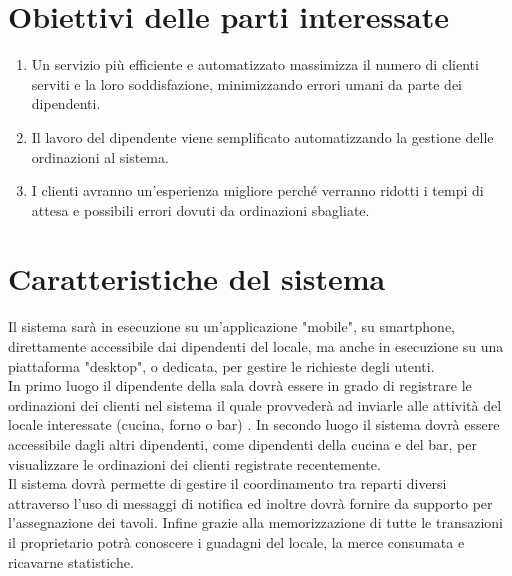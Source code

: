 \section{Obiettivi delle parti interessate}
\begin{enumerate}
    \item Un servizio più efficiente e automatizzato massimizza il numero di clienti serviti e la loro soddisfazione, minimizzando errori umani da parte dei dipendenti.
    \item Il lavoro del dipendente viene semplificato automatizzando la gestione delle ordinazioni al sistema.
    \item I clienti avranno un’esperienza migliore perché verranno ridotti i tempi di attesa e possibili errori dovuti da ordinazioni sbagliate. 
\end{enumerate}

\section{Caratteristiche del sistema}

Il sistema sarà in esecuzione su un’applicazione "mobile", su smartphone, direttamente accessibile dai dipendenti del locale, ma anche in esecuzione su una piattaforma "desktop", o dedicata, per gestire le richieste degli utenti. \\
In primo luogo il dipendente della sala dovrà essere in grado di registrare le ordinazioni dei clienti nel sistema il quale provvederà ad inviarle alle attività del locale interessate (cucina, forno o bar) . In secondo luogo il sistema dovrà essere accessibile dagli altri dipendenti, come dipendenti della cucina e del bar, per visualizzare le ordinazioni dei clienti registrate recentemente. \\Il sistema dovrà permette di gestire il coordinamento tra reparti diversi attraverso l'uso di messaggi di notifica ed inoltre dovrà fornire da supporto per l’assegnazione dei tavoli.
Infine grazie alla memorizzazione di tutte le transazioni il proprietario potrà conoscere i guadagni del locale, la merce consumata e ricavarne statistiche.


